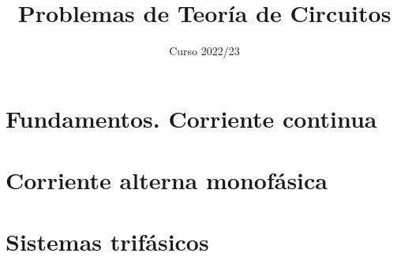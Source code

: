 \documentclass[oldfontcommands,a4paper]{memoir}
\begin{document}
\begin{titlingpage}

\title{Problemas de Teoría de Circuitos}

\author{}

\date{Curso 2022/23}

\maketitle


\end{titlingpage}

\frontmatter

\cleardoublepage{}

\tableofcontents*

\cleardoublepage{}

\mainmatter

\chapter{Fundamentos. Corriente continua}



\chapter{Corriente alterna monofásica}



\chapter{Sistemas trifásicos}




% 


\backmatter
\end{document}
